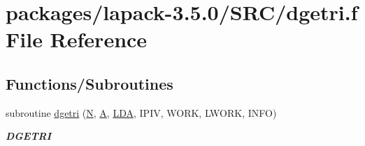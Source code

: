 \hypertarget{dgetri_8f}{}\section{packages/lapack-\/3.5.0/\+S\+R\+C/dgetri.f File Reference}
\label{dgetri_8f}
\subsection*{Functions/\+Subroutines}
\begin{DoxyCompactItemize}
\item 
subroutine \hyperlink{group__doubleGEcomputational_ga56d9c860ce4ce42ded7f914fdb0683ff}{dgetri} (\hyperlink{polmisc_8c_a0240ac851181b84ac374872dc5434ee4}{N}, \hyperlink{classA}{A}, \hyperlink{example__user_8c_ae946da542ce0db94dced19b2ecefd1aa}{L\+D\+A}, I\+P\+I\+V, W\+O\+R\+K, L\+W\+O\+R\+K, I\+N\+F\+O)
\begin{DoxyCompactList}\small\item\em {\bfseries D\+G\+E\+T\+R\+I} \end{DoxyCompactList}\end{DoxyCompactItemize}
